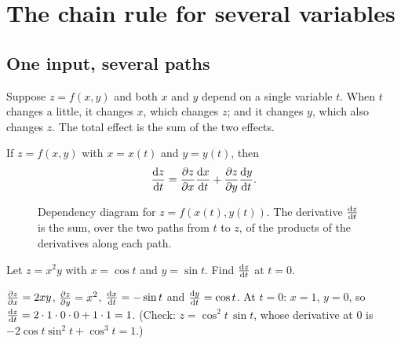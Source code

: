 \section{The chain rule for several variables}\label{sec:multivariable-chain-rule}

\subsection{One input, several paths}

Suppose $z = f(x, y)$ and both $x$ and $y$ depend on a single variable $t$.
When $t$ changes a little, it changes $x$, which changes $z$; and it changes
$y$, which also changes $z$. The total effect is the sum of the two effects.

\begin{theorem}\label{thm:chain-two}
If $z = f(x, y)$ with $x = x(t)$ and $y = y(t)$, then
\[
  \frac{\mathrm{d} z}{\mathrm{d} t} = \frac{\partial z}{\partial x}\frac{\mathrm{d} x}{\mathrm{d} t} + \frac{\partial z}{\partial y}\frac{\mathrm{d} y}{\mathrm{d} t}.
\]
\end{theorem}

\begin{figure}[htbp]
\centering
{}
\caption{Dependency diagram for $z = f(x(t), y(t))$. The derivative
  $\frac{\mathrm{d} z}{\mathrm{d} t}$ is the sum, over the two paths from $t$ to $z$, of the products
  of the derivatives along each path.}
\label{fig:chain-tree}
\end{figure}

\begin{example}
Let $z = x^2y$ with $x = \cos t$ and $y = \sin t$. Find $\frac{\mathrm{d} z}{\mathrm{d} t}$ at $t = 0$.

\sol $\frac{\partial z}{\partial x} = 2xy$, $\frac{\partial z}{\partial y} = x^2$, $\frac{\mathrm{d} x}{\mathrm{d} t} = -\sin t$ and
$\frac{\mathrm{d} y}{\mathrm{d} t} = \cos t$. At $t = 0$: $x = 1$, $y = 0$, so
$\frac{\mathrm{d} z}{\mathrm{d} t} = 2\cdot1\cdot0\cdot0 + 1\cdot1 = 1$. (Check:
$z = \cos^2t\,\sin t$, whose derivative at $0$ is $-2\cos t\sin^2t + \cos^3t
= 1$.)
\end{example}

